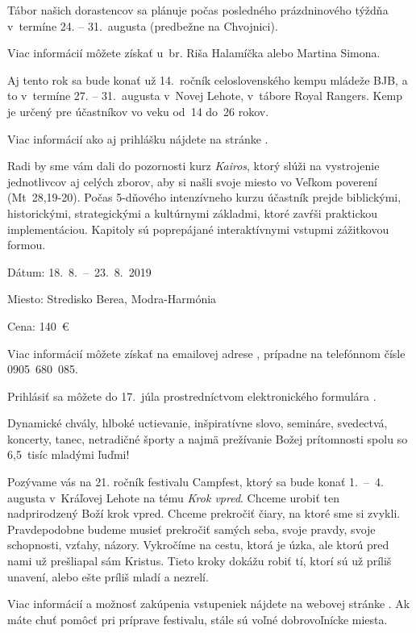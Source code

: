 Tábor našich dorastencov sa plánuje počas posledného prázdninového týždňa v~termíne 24. -- 31.~augusta (predbežne na Chvojnici).

Viac informácií môžete získať u~br. Riša Halamíčka alebo Martina Simona.


Aj tento rok sa bude konať už 14.~ročník celoslovenského kempu mládeže BJB, a to v~termíne 27. -- 31.~augusta v~Novej Lehote, v~tábore Royal Rangers. Kemp je určený pre účastníkov vo veku od~14 do~26 rokov.

Viac informácií ako aj prihlášku nájdete na stránke .


Radi by sme vám dali do pozornosti kurz {\it Kairos}, ktorý slúži na vystrojenie jednotlivcov aj celých zborov, aby si našli svoje miesto vo Veľkom poverení \hbox{(Mt 28,19-20)}. Počas 5-dňového intenzívneho kurzu účastník prejde biblickými, historickými, strategickými a kultúrnymi základmi, ktoré zavŕši praktickou implementáciou. Kapitoly sú poprepájané interaktívnymi vstupmi zážitkovou formou.

Dátum: 18.~8.~--~23.~8.~2019

Miesto: Stredisko Berea, Modra-Harmónia

Cena: 140~€

Viac informácií môžete získať na emailovej adrese , prípadne na telefónnom čísle 0905~680~085.

Prihlásiť sa môžete do 17.~júla prostredníctvom elektronického formulára .


Dynamické chvály, hlboké uctievanie, inšpiratívne slovo, semináre, svedectvá, koncerty, tanec, netradičné športy a najmä prežívanie Božej prítomnosti spolu so 6,5~tisíc mladými ľuďmi!

Pozývame vás na 21. ročník festivalu Campfest, ktorý sa bude konať 1.~--~4. augusta v~Kráľovej Lehote na tému {\it Krok vpred}. Chceme urobiť ten nadprirodzený Boží krok vpred. Chceme prekročiť čiary, na ktoré sme si zvykli. Pravdepodobne budeme musieť prekročiť samých seba, svoje pravdy, svoje schopnosti, vzťahy, názory. Vykročíme na cestu, ktorá je úzka, ale ktorú pred nami už prešliapal sám Kristus. Tieto kroky dokážu robiť tí, ktorí sú už príliš unavení, alebo ešte príliš mladí a nezrelí.

Viac informácií a možnosť zakúpenia vstupeniek nájdete na webovej stránke . Ak máte chuť pomôcť pri príprave festivalu, stále sú voľné dobrovoľnícke miesta.


